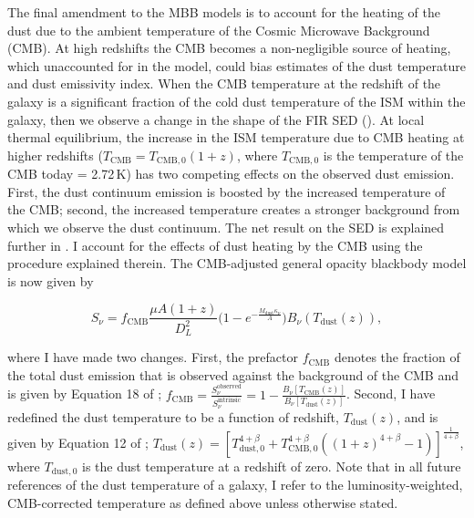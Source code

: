 The final amendment to the MBB models is to account for the heating of the dust due to the ambient temperature of the Cosmic Microwave Background (CMB). At high redshifts the CMB becomes a non-negligible source of heating, which unaccounted for in the model, could bias estimates of the dust temperature and dust emissivity index. When the CMB temperature at the redshift of the galaxy is a significant fraction of the cold dust temperature of the ISM within the galaxy, then we observe a change in the shape of the FIR SED (\citealt{daCunha_2013}). At local thermal equilibrium, the increase in the ISM temperature due to CMB heating at higher redshifts ($T_{\textrm{CMB}} = T_{\textrm{CMB}, 0}(1+z)$, where $T_{\textrm{CMB}, 0}$ is the temperature of the CMB today = 2.72\,K) has two competing effects on the observed dust emission. First, the dust continuum emission is boosted by the increased temperature of the CMB; second, the increased temperature creates a stronger background from which we observe the dust continuum. The net result on the SED is explained further in \citealt{daCunha_2013}. I account for the effects of dust heating by the CMB using the procedure explained therein. The CMB-adjusted general opacity blackbody model is now given by 

\begin{equation}
		S_\nu = f_{\textrm{CMB}}\frac{\mu A (1+z)}{D_L^2}\Bigg(1 - e^{- \frac{M_{\textrm{dust}}\kappa_\nu}{A}}\Bigg) B_\nu(T_{\textrm{dust}}(z)),
		\label{eq:modified_blackbody_general_opacity_a_cmb}
\end{equation}

where I have made two changes. First, the prefactor $f_{\textrm{CMB}}$ denotes the fraction of the total dust emission that is observed against the background of the CMB and is given by Equation 18 of \citealt{daCunha_2013}; $f_{\textrm{CMB}} = \frac{S_\nu^{\textrm{observed}}}{S_\nu^{\textrm{intrinsic}}} = 1 - \frac{B_\nu[T_{\textrm{CMB}}(z)]}{B_\nu[T_{\textrm{dust}}(z)]}$. Second, I have redefined the dust temperature to be a function of redshift, $T_{\textrm{dust}}(z)$, and is given by Equation 12 of \citealt{daCunha_2013}; $T_{\textrm{dust}}(z) = [T_{\textrm{dust}, 0}^{4+\beta} + T_{\textrm{CMB}, 0}^{4+\beta} ((1+z)^{4+\beta} - 1)]^{\frac{1}{4+\beta}}$, where $T_{\textrm{dust}, 0}$ is the dust temperature at a redshift of zero. Note that in all future references of the dust temperature of a galaxy, I refer to the luminosity-weighted, CMB-corrected temperature as defined above unless otherwise stated.

